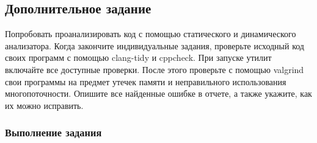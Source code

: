 \subsection{Дополнительное задание}
Попробовать проанализировать код с помощью статического и динамического анализатора. Когда закончите индивидуальные задания, проверьте исходный код своих программ с помощью clang-tidy и cppcheck. При запуске утилит включайте все доступные проверки. После этого проверьте с помощью valgrind свои программы на предмет утечек памяти и неправильного использования многопоточности. Опишите все найденные ошибке в отчете, а также укажите, как их можно исправить.

\subsubsection{Выполнение задания}

